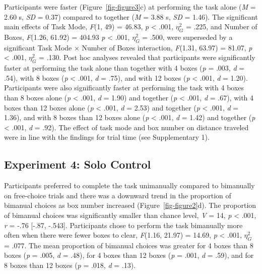 \documentclass[
  11pt,
  letterpaper,
]{article}
\renewcommand{\emph}[1]{\textit{#1}}  %
\begin{document}
Participants were faster (Figure~\ref{fig-figure3}c) at performing the
task alone (\emph{M} = 2.60 s, \emph{SD} = 0.37) compared to together
(\emph{M} = 3.88 s, \emph{SD} = 1.46). The significant main effects of
Task Mode, \emph{F}(1, 49) = 46.83, \emph{p} \textless{} .001,
\(\eta_{G}^{2}\) = .225, and Number of Boxes, \emph{F}(1.26, 61.92) =
404.93 \emph{p} \textless{} .001, \(\eta_{G}^{2}\) = .500, were
superseded by a significant Task Mode × Number of Boxes interaction,
\emph{F}(1.31, 63.97) = 81.07, \emph{p} \textless{} .001,
\(\eta_{G}^{2}\) = .130. Post hoc analyses revealed that participants
were significantly faster at performing the task alone than together
with 4 boxes (\emph{p} = .003, \emph{d} = .54), with 8 boxes (\emph{p}
\textless{} .001, \emph{d} = .75), and with 12 boxes (\emph{p}
\textless{} .001, \emph{d} = 1.20). Participants were also significantly
faster at performing the task with 4 boxes than 8 boxes alone (\emph{p}
\textless{} .001, \emph{d} = 1.90) and together (\emph{p} \textless{}
.001, \emph{d} = .67), with 4 boxes than 12 boxes alone (\emph{p}
\textless{} .001, \emph{d} = 2.53) and together (\emph{p} \textless{}
.001, \emph{d} = 1.36), and with 8 boxes than 12 boxes alone (\emph{p}
\textless{} .001, \emph{d} = 1.42) and together (\emph{p} \textless{}
.001, \emph{d} = .92). The effect of task mode and box number on
distance traveled were in line with the findings for trial time (see
Supplementary 1).

\subsection{Experiment 4: Solo
Control}\label{experiment-4-solo-control-1}

Participants preferred to complete the task unimanually compared to
bimanually on free-choice trials and there was a downward trend in the
proportion of bimanual choices as box number increased
(Figure~\ref{fig-figure2}d). The proportion of bimanual choices was
significantly smaller than chance level, \emph{V} = 14, \emph{p}
\textless{} .001, \emph{r} = -.76 {[}-.87, -.543{]}. Participants chose
to perform the task bimanually more often when there were fewer boxes to
clear, \emph{F}(1.16, 21.97) = 14.69, \emph{p} \textless{} .001,
\(\eta_{G}^{2}\) = .077. The mean proportion of bimanual choices was
greater for 4 boxes than 8 boxes (\emph{p} = .005, \emph{d} = .48), for
4 boxes than 12 boxes (\emph{p} = .001, \emph{d} = .59), and for 8 boxes
than 12 boxes (\emph{p} = .018, \emph{d} = .13).
\end{document}
